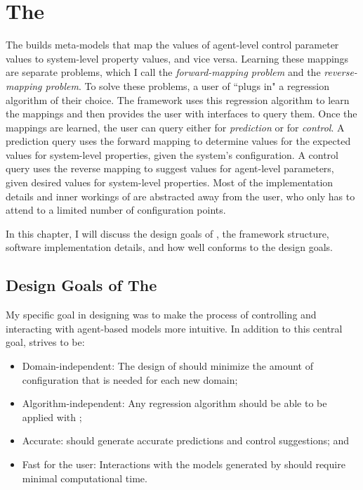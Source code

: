 \chapter{The \FRAMEWORK}
\thispagestyle{plain}

\label{Framework}

The \framework builds meta-models that map the values of agent-level control parameter values to system-level property values, and vice versa.
Learning these mappings are separate problems, which I call the \textit{forward-mapping problem} and the \textit{reverse-mapping problem}.
To solve these problems, a user of \fw ``plugs in" a regression algorithm of their choice.
The framework uses this regression algorithm to learn the mappings and then provides the user with interfaces to query them.
Once the mappings are learned, the user can query either for \textit{prediction} or for \textit{control}.
A prediction query uses the forward mapping to determine values for the expected values for system-level properties, given the system's configuration.
A control query uses the reverse mapping to suggest values for agent-level parameters, given desired values for system-level properties.
Most of the implementation details and inner workings of \fw are abstracted away from the user, who only has to attend to a limited number of configuration points.

In this chapter, I will discuss the design goals of \fw, the framework structure, software implementation details, and how well \fw conforms to the design goals.


\section{Design Goals of The \framework}

My specific goal in designing \fw was to make the process of controlling and interacting with agent-based models more intuitive.
In addition to this central goal, \fw strives to be:
\begin{itemize}
  \item Domain-independent: The design of \fw should minimize the amount of configuration that is needed for each new domain;
  \item Algorithm-independent: Any regression algorithm should be able to be applied with \fw;
  \item Accurate: \fw should generate accurate predictions and control suggestions; and
  \item Fast for the user: Interactions with the models generated by \fw should require minimal computational time.
\end{itemize}

